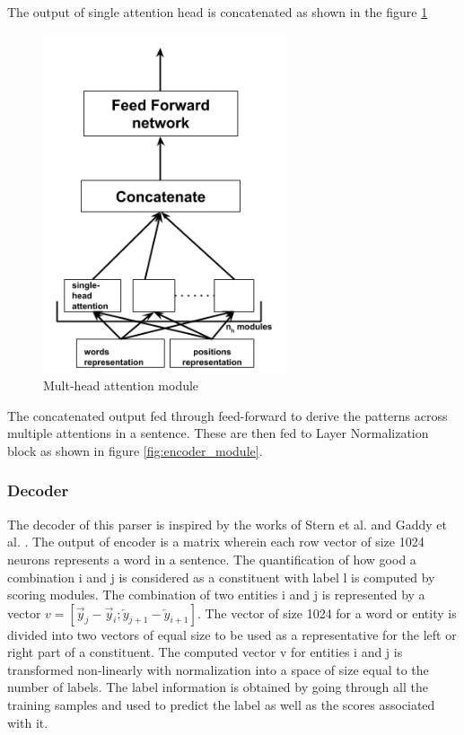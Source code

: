 \documentclass[a4paper, 11pt]{article}
\begin{document}
The output of single attention head is concatenated as shown in the figure \ref{fig:multi_head_attention_module}
\begin{figure}[htpb]
    \centering
    \includegraphics[width=\textwidth,height=10cm,keepaspectratio=true]
    {multi-head-attention.png}
    \caption{
        Mult-head attention module
    }
    \label{fig:multi_head_attention_module}
\end{figure}

The concatenated output fed through feed-forward to derive the patterns across multiple attentions in a sentence. These are then fed to Layer Normalization block as shown in figure \ref{fig:encoder_module}.

\subsubsection{Decoder}
The decoder of this parser is inspired by the works of Stern et al. \parencite{Stern2017} and Gaddy et al. \parencite{Gaddy2018}. The output of encoder is a matrix wherein each row vector of size 1024 neurons represents a word in a sentence. The quantification of how good a combination i and j is considered as a constituent with label l is computed by scoring modules. The combination of two entities i and j is represented by a vector  $v = [\overrightarrow{y}_j - \overrightarrow{y}_i; \overleftarrow{y}_{j+1} - \overleftarrow{y}_{i+1}]$. The vector of size 1024 for a word or entity is divided into two vectors of equal size to be used as a representative for the left or right part of a constituent. The computed vector v for entities i and j  is transformed non-linearly with normalization into a space of size equal to the number of labels. The label information is obtained by going through all the training samples and used to predict the label as well as the scores associated with it. 
\end{document}
